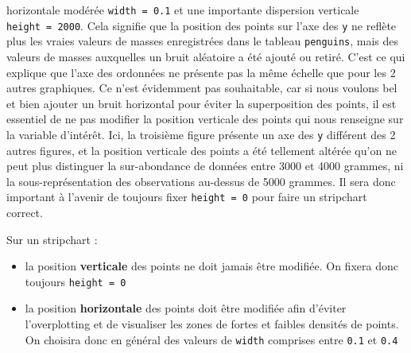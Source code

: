 \documentclass[
  letterpaper,
  DIV=11,
  numbers=noendperiod]{scrreprt}
\providecommand{\tightlist}{%
  \setlength{\itemsep}{0pt}\setlength{\parskip}{0pt}}\usepackage{longtable,booktabs,array}
\begin{document}
\begin{itemize}
  horizontale modérée \texttt{width\ =\ 0.1} et une importante
  dispersion verticale \texttt{height\ =\ 2000}. Cela signifie que la
  position des points sur l'axe des \texttt{y} ne reflète plus les
  vraies valeurs de masses enregistrées dans le tableau
  \texttt{penguins}, mais des valeurs de masses auxquelles un bruit
  aléatoire a été ajouté ou retiré. C'est ce qui explique que l'axe des
  ordonnées ne présente pas la même échelle que pour les 2 autres
  graphiques. Ce n'est évidemment pas souhaitable, car si nous voulons
  bel et bien ajouter un bruit horizontal pour éviter la superposition
  des points, il est essentiel de ne pas modifier la position verticale
  des points qui nous renseigne sur la variable d'intérêt. Ici, la
  troisième figure présente un axe des \texttt{y} différent des 2 autres
  figures, et la position verticale des points a été tellement altérée
  qu'on ne peut plus distinguer la sur-abondance de données entre 3000
  et 4000 grammes, ni la sous-représentation des observations au-dessus
  de 5000 grammes. Il sera donc important à l'avenir de toujours fixer
  \texttt{height\ =\ 0} pour faire un stripchart correct.
\end{itemize}

\begin{tcolorbox}[enhanced jigsaw, bottomtitle=1mm, title=\textcolor{quarto-callout-important-color}{\faExclamation}\hspace{0.5em}{Important}, breakable, opacitybacktitle=0.6, coltitle=black, opacityback=0, toprule=.15mm, toptitle=1mm, titlerule=0mm, colback=white, rightrule=.15mm, arc=.35mm, leftrule=.75mm, bottomrule=.15mm, left=2mm, colframe=quarto-callout-important-color-frame, colbacktitle=quarto-callout-important-color!10!white]

Sur un stripchart :

\begin{itemize}
\tightlist
\item
  la position \textbf{verticale} des points ne doit jamais être
  modifiée. On fixera donc toujours \texttt{height\ =\ 0}
\item
  la position \textbf{horizontale} des points doit être modifiée afin
  d'éviter l'overplotting et de visualiser les zones de fortes et
  faibles densités de points. On choisira donc en général des valeurs de
  \texttt{width} comprises entre \texttt{0.1} et \texttt{0.4}
\end{itemize}

\end{tcolorbox}
\end{document}
